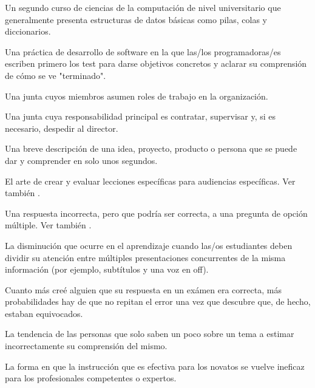 \begin{description}
 Un segundo curso de ciencias de la computación de nivel universitario 
que generalmente presenta estructuras de datos básicas como pilas, colas y diccionarios.


 Una práctica de desarrollo 
de software en la que las/los programadoras/es escriben primero los test 
para darse objetivos concretos y aclarar su comprensión de cómo se ve "terminado".

 Una junta cuyos miembros asumen roles de trabajo en la organización.

 Una junta cuya responsabilidad principal es
contratar, supervisar y, si es necesario, despedir al director.

 Una breve descripción de una idea, 
proyecto, producto o persona que se puede dar y comprender en solo unos segundos.

 El arte de crear y evaluar 
lecciones específicas para audiencias específicas. Ver también
.

 Una respuesta incorrecta, pero que
podría ser correcta, a una pregunta de opción múltiple. Ver también
.

 La disminución que ocurre 
en el aprendizaje cuando las/os estudiantes deben dividir su atención entre múltiples presentaciones concurrentes de la misma información (por ejemplo, subtítulos y una voz en off).

 Cuanto más creé alguien 
que su respuesta en un exámen era correcta, más probabilidades hay de que no 
repitan el error una vez que descubre que, de hecho, estaban equivocados.

 La tendencia de las personas que solo saben  un poco sobre un tema a estimar incorrectamente su comprensión del mismo.

 La forma en que 
la instrucción que es efectiva para los novatos se vuelve ineficaz para 
los profesionales competentes o expertos.


\end{description}
